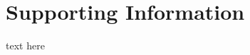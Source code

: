 \chapter*{Supporting Information}

\makeatletter
\renewcommand{\fnum@figure}{\figurename~S\thefigure}
\makeatother

\makeatletter
\renewcommand{\fnum@table}{\tablename~S\thetable}
\makeatother

\setcounter{figure}{0}

	text here